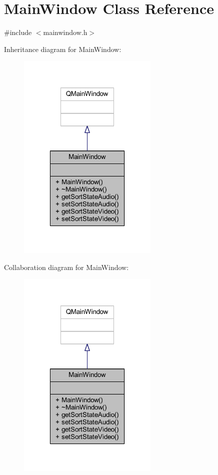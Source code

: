 \hypertarget{class_main_window}{\section{Main\-Window Class Reference}
\label{class_main_window}
}


{\ttfamily \#include $<$mainwindow.\-h$>$}



Inheritance diagram for Main\-Window\-:
\nopagebreak
\begin{figure}[H]
\begin{center}
\leavevmode
\includegraphics[width=190pt]{class_main_window__inherit__graph}
\end{center}
\end{figure}


Collaboration diagram for Main\-Window\-:
\nopagebreak
\begin{figure}[H]
\begin{center}
\leavevmode
\includegraphics[width=190pt]{class_main_window__coll__graph}
\end{center}
\end{figure}

